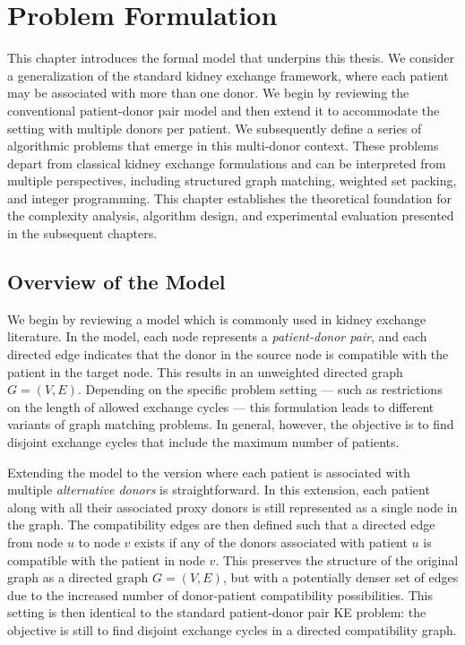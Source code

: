\chapter{Problem Formulation}
\label{cha:problem_formulation}

This chapter introduces the formal model that underpins this thesis. We consider a generalization of the standard kidney exchange framework, where each patient may be associated with more than one donor. We begin by reviewing the conventional patient-donor pair model and then extend it to accommodate the setting with multiple donors per patient. We subsequently define a series of algorithmic problems that emerge in this multi-donor context. These problems depart from classical kidney exchange formulations and can be interpreted from multiple perspectives, including structured graph matching, weighted set packing, and integer programming. This chapter establishes the theoretical foundation for the complexity analysis, algorithm design, and experimental evaluation presented in the subsequent chapters.

\section{Overview of the Model}

We begin by reviewing a model which is commonly used in kidney exchange literature. In the model, each node represents a \textit{patient-donor pair}, and each directed edge indicates that the donor in the source node is compatible with the patient in the target node. This results in an unweighted directed graph $G = (V, E)$. Depending on the specific problem setting — such as restrictions on the length of allowed exchange cycles — this formulation leads to different variants of graph matching problems. In general, however, the objective is to find disjoint exchange cycles that include the maximum number of patients.

Extending the model to the version where each patient is associated with multiple \textit{alternative donors} is straightforward. In this extension, each patient along with all their associated proxy donors is still represented as a single node in the graph. The compatibility edges are then defined such that a directed edge from node $u$ to node $v$ exists if any of the donors associated with patient $u$ is compatible with the patient in node $v$. This preserves the structure of the original graph as a directed graph $G = (V, E)$, but with a potentially denser set of edges due to the increased number of donor-patient compatibility possibilities. This setting is then identical to the standard patient-donor pair \ac{KE} problem: the objective is still to find disjoint exchange cycles in a directed compatibility graph.

